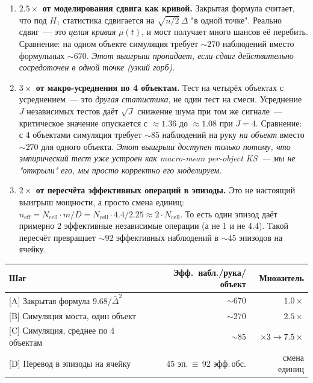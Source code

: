 \documentclass[11pt]{article}
\begin{document}
\begin{enumerate}[leftmargin=2em, itemsep=4pt]
\item \textbf{$2.5\times$ от моделирования сдвига как кривой.} Закрытая формула считает, что под $H_1$ статистика сдвигается на $\sqrt{n/2}\,\Delta$ "в одной точке". Реально сдвиг~--- это \emph{целая кривая} $\mu(t)$, и мост получает много шансов её перебить. Сравнение: на одном объекте симуляция требует $\sim 270$ наблюдений вместо формульных $\sim 670$. \emph{Этот выигрыш пропадает, если сдвиг действительно сосредоточен в одной точке (узкий горб).}

\item \textbf{$3\times$ от макро-усреднения по 4 объектам.} Тест на четырёх объектах с усреднением~--- это \emph{другая статистика}, не один тест на смеси. Усреднение $J$ независимых тестов даёт $\sqrt{J}$ снижение шума при том же сигнале~--- критическое значение опускается с $\approx 1.36$ до $\approx 1.08$ при $J=4$. Сравнение: с 4 объектами симуляция требует $\sim 85$ наблюдений на руку \emph{на объект} вместо $\sim 270$ для одного объекта. \emph{Этот выигрыш доступен только потому, что эмпирический тест уже устроен как macro-mean per-object KS~--- мы не "открыли" его, мы просто корректно его моделируем.}

\item \textbf{$2\times$ от пересчёта эффективных операций в эпизоды.} Это не настоящий выигрыш мощности, а просто смена единиц: $n_\text{eff} = N_\text{cell} \cdot m / D = N_\text{cell} \cdot 4.4 / 2.25 \approx 2 \cdot N_\text{cell}$. То есть один эпизод даёт примерно 2 эффективные независимые операции (а не 1 и не 4.4). Такой пересчёт превращает $\sim 92$ эффективных наблюдений в $\sim 45$ эпизодов на ячейку.
\end{enumerate}

\medskip
\begin{tabular}{lrr}
\toprule
Шаг & Эфф.~набл./рука/объект & Множитель \\
\midrule
{}[A] Закрытая формула $9.68/\bar\Delta^2$ & $\sim 670$ & $1.0\times$ \\
{}[B] Симуляция моста, один объект & $\sim 270$ & $2.5\times$ \\
{}[C] Симуляция, среднее по 4 объектам & $\sim 85$ & $\times 3 \to 7.5\times$ \\
{}[D] Перевод в эпизоды на ячейку & 45 эп.\,$\equiv$\,92 эфф.\,обс. & смена единиц \\
\bottomrule
\end{tabular}
\end{document}
